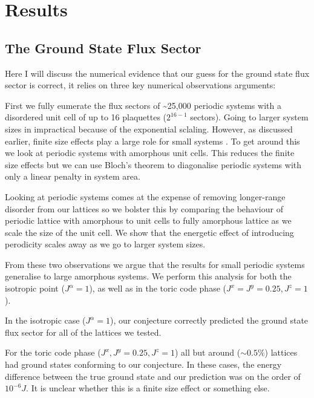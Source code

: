 \hypertarget{results}{%
\section{Results}\label{results}}

\hypertarget{the-ground-state-flux-sector}{%
\subsection{The Ground State Flux Sector}\label{the-ground-state-flux-sector}}

Here I will discuss the numerical evidence that our guess for the ground state flux sector is correct, it relies on three key numerical observations arguments:

First we fully eumerate the flux sectors of \textasciitilde25,000 periodic systems with a disordered unit cell of up to 16 plaquettes (\(2^{16-1}\) sectors). Going to larger system sizes in impractical because of the exponential sclaling. However, as discussed earlier, finite size effects play a large role for small systems \autocite{kitaevAnyonsExactlySolved2006}. To get around this we look at periodic systems with amorphous unit cells. This reduces the finite size effects but we can use Bloch's theorem to diagonalise periodic systems with only a linear penalty in system area.

Looking at periodic systems comes at the expense of removing longer-range disorder from our lattices so we bolster this by comparing the behaviour of periodic lattice with amorphous to unit cells to fully amorphous lattice as we scale the size of the unit cell. We show that the energetic effect of introducing perodicity scales away as we go to larger system sizes.

From these two observations we argue that the results for small periodic systems generalise to large amorphous systems. We perform this analysis for both the isotropic point (\(J^\alpha = 1\)), as well as in the toric code phase (\(J^x = J^y = 0.25, J^z = 1\)).

In the isotropic case (\(J^\alpha = 1\)), our conjecture correctly predicted the ground state flux sector for all of the lattices we tested.

For the toric code phase (\(J^x, J^y = 0.25, J^z = 1\)) all but around (\(\sim 0.5 \%\)) lattices had ground states conforming to our conjecture. In these cases, the energy difference between the true ground state and our prediction was on the order of \(10^{-6} J\). It is unclear whether this is a finite size effect or something else.

